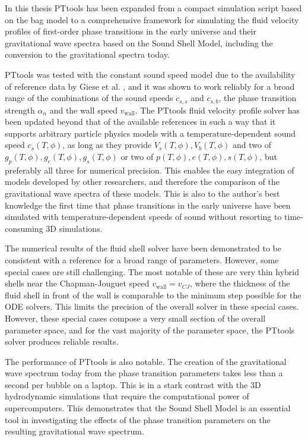 In this thesis PTtools has been expanded from a compact simulation script based on the bag model
to a comprehensive framework for simulating the fluid velocity profiles of first-order phase transitions in the early universe
and their gravitational wave spectra based on the Sound Shell Model,
including the conversion to the gravitational spectra today.

PTtools was tested with the constant sound speed model due to the availability of reference data by Giese et al. \cite{giese_2021},
and it was shown to work reliably for a broad range of the combinations of the sound speeds $c_{s,s}$ and $c_{s,b}$, the phase transition strength $\alpha_n$ and the wall speed $v_\text{wall}$.
The PTtools fluid velocity profile solver has been updated beyond that of the available references in such a way
that it supports arbitrary particle physics models with a temperature-dependent sound speed $c_s(T,\phi)$,
as long as they provide $V_s(T,\phi), V_b(T,\phi)$ and two of $g_p(T,\phi), g_e(T,\phi), g_s(T,\phi)$ or two of $p(T,\phi), e(T,\phi), s(T,\phi)$, but preferably all three for numerical precision.
This enables the easy integration of models developed by other researchers,
and therefore the comparison of the gravitational wave spectra of these models.
This is also to the author's best knowledge the first time that phase transitions in the early universe have been simulated with temperature-dependent speeds of sound without resorting to time-consuming 3D simulations.

The numerical results of the fluid shell solver have been demonstrated to be consistent with a reference
for a broad range of parameters.
However, some special cases are still challenging.
The most notable of these are very thin hybrid shells near the Chapman-Jouguet speed $v_\text{wall} = v_{CJ}$,
where the thickness of the fluid shell in front of the wall is comparable to the minimum step possible for the ODE solvers.
This limits the precision of the overall solver in these special cases.
However, these special cases compose a very small section of the overall parameter space,
and for the vast majority of the parameter space,
the PTtools solver produces reliable results.

The performance of PTtools is also notable.
The creation of the gravitational wave spectrum today from the phase transition parameters takes less than a second per bubble on a laptop.
This is in a stark contrast with the 3D hydrodynamic simulations that require the computational power of supercomputers.
This demonstrates that the Sound Shell Model is an essential tool in investigating
the effects of the phase transition parameters on the resulting gravitational wave spectrum.

